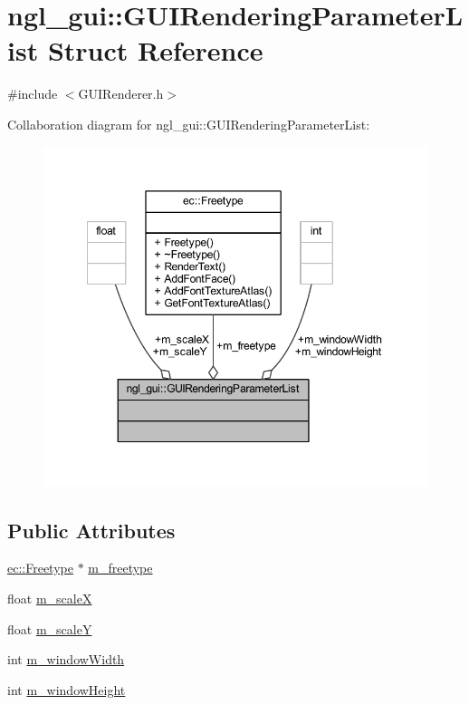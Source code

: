 \hypertarget{structngl__gui_1_1_g_u_i_rendering_parameter_list}{}\section{ngl\+\_\+gui\+:\+:G\+U\+I\+Rendering\+Parameter\+List Struct Reference}
\label{structngl__gui_1_1_g_u_i_rendering_parameter_list}


{\ttfamily \#include $<$G\+U\+I\+Renderer.\+h$>$}



Collaboration diagram for ngl\+\_\+gui\+:\+:G\+U\+I\+Rendering\+Parameter\+List\+:\nopagebreak
\begin{figure}[H]
\begin{center}
\leavevmode
\includegraphics[width=349pt]{structngl__gui_1_1_g_u_i_rendering_parameter_list__coll__graph}
\end{center}
\end{figure}
\subsection*{Public Attributes}
\begin{DoxyCompactItemize}
\item 
\mbox{\hyperlink{classec_1_1_freetype}{ec\+::\+Freetype}} $\ast$ \mbox{\hyperlink{structngl__gui_1_1_g_u_i_rendering_parameter_list_a7613842cdc4f58969a2e913a0fa2bda0}{m\+\_\+freetype}}
\item 
float \mbox{\hyperlink{structngl__gui_1_1_g_u_i_rendering_parameter_list_a66e96c2c30bab54cb1e0c0b5fb79f0a0}{m\+\_\+scaleX}}
\item 
float \mbox{\hyperlink{structngl__gui_1_1_g_u_i_rendering_parameter_list_a3414b58859bb05449327f17bfc39dfca}{m\+\_\+scaleY}}
\item 
int \mbox{\hyperlink{structngl__gui_1_1_g_u_i_rendering_parameter_list_a57d3c0a09ed6c8b5d18472754024f6b6}{m\+\_\+window\+Width}}
\item 
int \mbox{\hyperlink{structngl__gui_1_1_g_u_i_rendering_parameter_list_acd396e477c473b4edf181953eb791639}{m\+\_\+window\+Height}}
\end{DoxyCompactItemize}


